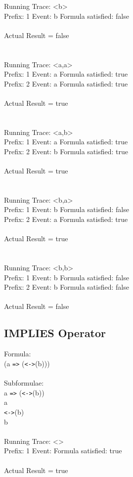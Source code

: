 Running Trace: \textless b\textgreater\\
  Prefix: 1 Event: b Formula satisfied: false\\
\\
Actual Result = false\\
\\
\\
Running Trace: \textless a,a\textgreater\\
  Prefix: 1 Event: a Formula satisfied: true\\
  Prefix: 2 Event: a Formula satisfied: true\\
\\
Actual Result = true\\
\\
\\
Running Trace: \textless a,b\textgreater\\
  Prefix: 1 Event: a Formula satisfied: true\\
  Prefix: 2 Event: b Formula satisfied: true\\
\\
Actual Result = true\\
\\
\\
Running Trace: \textless b,a\textgreater\\
  Prefix: 1 Event: b Formula satisfied: false\\
  Prefix: 2 Event: a Formula satisfied: true\\
\\
Actual Result = true\\
\\
\\
Running Trace: \textless b,b\textgreater\\
  Prefix: 1 Event: b Formula satisfied: false\\
  Prefix: 2 Event: b Formula satisfied: false\\
\\
Actual Result = false\\

\subsection{IMPLIES Operator}

Formula:\\
(a \texttt{=>} (\texttt{<->}(b)))\\
\\
Subformulae:\\
a \texttt{=>} (\texttt{<->}(b))\\
a\\
\texttt{<->}(b)\\
b\\
\\
Running Trace: \textless \textgreater\\
  Prefix: 1 Event:  Formula satisfied: true\\
\\
Actual Result = true\\


